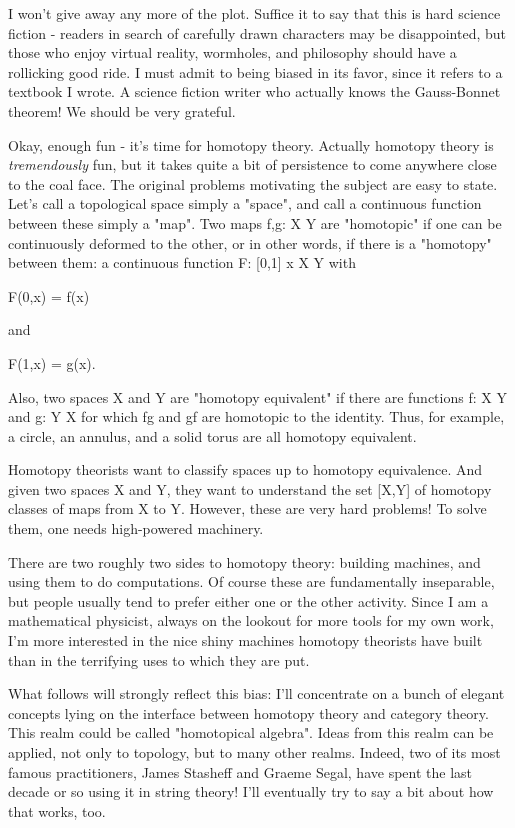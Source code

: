 I won't give away any more of the plot.  Suffice it to say that this is
hard science fiction - readers in search of carefully drawn characters
may be disappointed, but those who enjoy virtual reality, wormholes, and
philosophy should have a rollicking good ride.  I must admit to being
biased in its favor, since it refers to a textbook I wrote.  A science 
fiction writer who actually knows the Gauss-Bonnet theorem!  We should
be very grateful.

Okay, enough fun - it's time for homotopy theory.  Actually homotopy
theory is \emph{tremendously} fun, but it takes quite a bit of persistence to
come anywhere close to the coal face.  The original problems motivating
the subject are easy to state.  Let's call a topological space simply
a "space", and call a continuous function between these simply a "map".
Two maps f,g: X \to  Y are "homotopic" if one can be continuously deformed
to the other, or in other words, if there is a "homotopy" between them:
a continuous function F: [0,1] x X \to  Y with

F(0,x) = f(x)

and 

F(1,x) = g(x).  

Also, two spaces X and Y are "homotopy equivalent" if there are
functions f: X \to  Y and g: Y \to  X for which fg and gf are homotopic to
the identity.  Thus, for example, a circle, an annulus, and a solid
torus are all homotopy equivalent.

Homotopy theorists want to classify spaces up to homotopy equivalence.
And given two spaces X and Y, they want to understand the set [X,Y] of
homotopy classes of maps from X to Y.  However, these are very hard
problems!  To solve them, one needs high-powered machinery.

There are two roughly two sides to homotopy theory: building machines,
and using them to do computations.  Of course these are fundamentally
inseparable, but people usually tend to prefer either one or the other
activity.  Since I am a mathematical physicist, always on the lookout
for more tools for my own work, I'm more interested in the nice shiny
machines homotopy theorists have built than in the terrifying uses to
which they are put.  

What follows will strongly reflect this bias: I'll concentrate on a
bunch of elegant concepts lying on the interface between homotopy theory
and category theory.  This realm could be called "homotopical algebra".
Ideas from this realm can be applied, not only to topology, but to many
other realms.  Indeed, two of its most famous practitioners, James
Stasheff and Graeme Segal, have spent the last decade or so using it in
string theory!  I'll eventually try to say a bit about how that works,
too.

